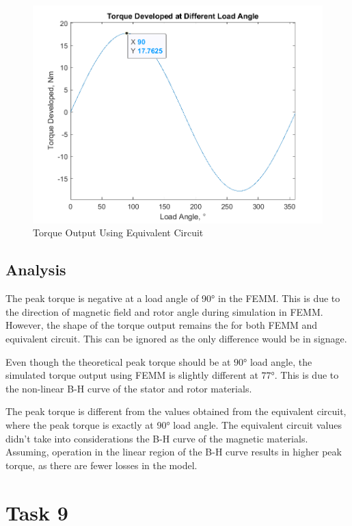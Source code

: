 \documentclass[12pt]{article}
\begin{document}
\begin{figure}[H]
    \centering
    \includegraphics[width=\linewidth]{img/task_8_circuit.png}
    \caption{Torque Output Using Equivalent Circuit}
    \label{fig:task-8-circuit}
\end{figure}

\subsection{Analysis}

The peak torque is negative at a load angle of \ang{90} in the FEMM. This is due to the direction of magnetic field and rotor angle during simulation in FEMM. However, the shape of the torque output remains the for both FEMM and equivalent circuit. This can be ignored as the only difference would be in signage.

Even though the theoretical peak torque should be at $\ang{90}$ load angle, the simulated torque output using FEMM is slightly different at $\ang{77}$. This is due to the non-linear B-H curve of the stator and rotor materials. 

The peak torque is different from the values obtained from the equivalent circuit, where the peak torque is exactly at \ang{90} load angle. The equivalent circuit values didn't take into considerations the B-H curve of the magnetic materials. Assuming, operation in the linear region of the B-H curve results in higher peak torque, as there are fewer losses in the model.

\section{Task 9}
\end{document}

